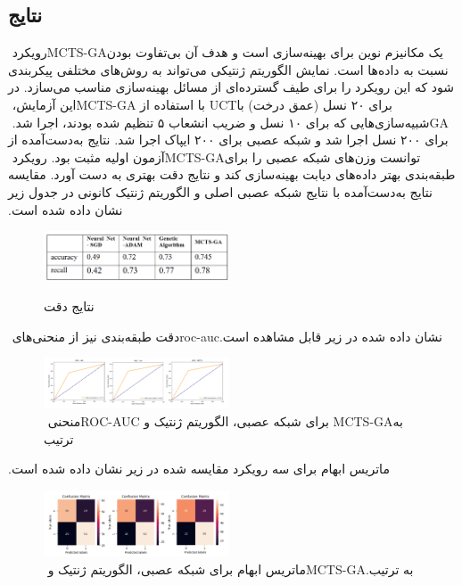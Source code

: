 \documentclass[11pt]{article}
\begin{document}
\begin{multicols}{2}
		\section{نتایج}
		رویکرد ‏MCTS-GA‏ یک مکانیزم نوین برای بهینه‌سازی است و هدف آن ‏بی‌تفاوت بودن نسبت به داده‌ها است. نمایش الگوریتم ژنتیکی می‌تواند به ‏روش‌های مختلفی پیکربندی شود که این رویکرد را برای طیف گسترده‌ای ‏از مسائل بهینه‌سازی مناسب می‌سازد. در این آزمایش، ‏MCTS-GA‏ با ‏استفاده از ‏UCT‏ برای ۲۰ نسل (عمق درخت) با شبیه‌سازی‌هایی که برای ‏‏۱۰ نسل و ضریب انشعاب ۵ تنظیم شده بودند، اجرا شد. ‏GA‏ برای ۲۰۰ ‏نسل اجرا شد و شبکه عصبی برای ۲۰۰ ایپاک اجرا شد.‏
		نتایج به‌دست‌آمده از آزمون اولیه مثبت بود. رویکرد ‏MCTS-GA‏ توانست ‏وزن‌های شبکه عصبی را برای طبقه‌بندی بهتر داده‌های دیابت ‏بهینه‌سازی کند و نتایج دقت بهتری به دست آورد.‏
		مقایسه نتایج به‌دست‌آمده با نتایج شبکه عصبی اصلی و الگوریتم ژنتیک کانونی ‏در جدول زیر نشان داده شده است.‏
		\begin{figure}[H]
			\centering
			\caption{نتایج دقت}
			\includegraphics[width=0.49\textwidth,keepaspectratio]{6.png}
			\label{fig:fig6}
		\end{figure}
		دقت طبقه‌بندی نیز از منحنی‌های ‏roc-auc‏ نشان داده شده در زیر قابل ‏مشاهده است.‏
		\begin{figure}[H]
			\centering
			\includegraphics[width=0.49\textwidth,keepaspectratio]{7.png}
			\caption{منحنی ‏ROC-AUC‏ برای شبکه عصبی، الگوریتم ژنتیک و ‏MCTS-GA‏ به ترتیب‏}
			\label{fig:fig7}
		\end{figure}
		ماتریس ابهام برای سه رویکرد مقایسه شده در زیر نشان داده شده است.‏
		\begin{figure}[H]
			\centering
			\includegraphics[width=0.49\textwidth,keepaspectratio]{8.png}
			\caption{ماتریس ابهام برای شبکه عصبی، الگوریتم ژنتیک و ‏MCTS-‎GA‏ به ترتیب.‏}
			\label{fig:fig8}
		\end{figure}
		

\end{multicols}
\end{document}
